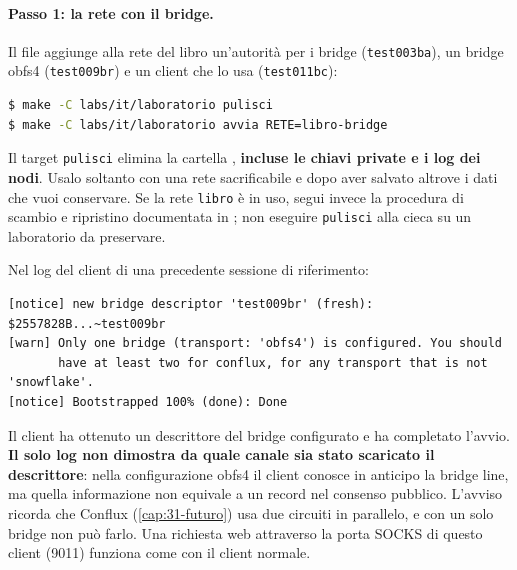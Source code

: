 \paragraph{Passo 1: la rete con il bridge.} Il file  aggiunge alla rete del libro un'autorità per i bridge (\texttt{test003ba}), un bridge obfs4 (\texttt{test009br}) e un client che lo usa (\texttt{test011bc}):
\begin{lstlisting}[language=bash,numbers=none]
$ make -C labs/it/laboratorio pulisci
$ make -C labs/it/laboratorio avvia RETE=libro-bridge
\end{lstlisting}
\begin{attenzione}
Il target \texttt{pulisci} elimina la cartella ,
\textbf{incluse le chiavi private e i log dei nodi}. Usalo soltanto con
una rete sacrificabile e dopo aver salvato altrove i dati che vuoi
conservare. Se la rete \texttt{libro} è in uso, segui invece la
procedura di scambio e ripristino documentata in
; non eseguire
\texttt{pulisci} alla cieca su un laboratorio da preservare.
\end{attenzione}

Nel log del client di una precedente sessione di riferimento:
\begin{lstlisting}[numbers=none]
[notice] new bridge descriptor 'test009br' (fresh): $2557828B...~test009br
[warn] Only one bridge (transport: 'obfs4') is configured. You should
       have at least two for conflux, for any transport that is not 'snowflake'.
[notice] Bootstrapped 100% (done): Done
\end{lstlisting}
Il client ha ottenuto un descrittore del bridge configurato e ha completato l'avvio. \textbf{Il solo log non dimostra da quale canale sia stato scaricato il descrittore}: nella configurazione obfs4 il client conosce in anticipo la bridge line, ma quella informazione non equivale a un record nel consenso pubblico. L'avviso ricorda che Conflux (\cref{cap:31-futuro}) usa due circuiti in parallelo, e con un solo bridge non può farlo. Una richiesta web attraverso la porta SOCKS di questo client (9011) funziona come con il client normale.

